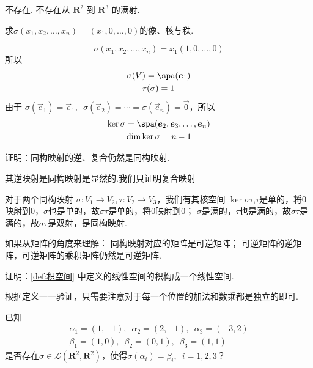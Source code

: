 \begin{exercise}
\begin{exgroup}
        \begin{answer}
            不存在. 不存在从 $ \mathbf{R}^2 $ 到 $ \mathbf{R}^3 $ 的满射.
        \end{answer}
        \item 求$\sigma(x_1,x_2,\ldots,x_n)=(x_1,0,\ldots,0)$的像、核与秩.
        \begin{answer}
            \[ \sigma(x_1, x_2, \ldots, x_n) = x_1(1, 0, \ldots, 0) \]
          所以
          \begin{gather*}
              \sigma(V) = \spa(\vec{e}_1) \\
              r(\sigma) = 1
          \end{gather*}
          由于 $ \sigma(\vec{e}_1) = \vec{e}_1,\enspace \sigma(\vec{e}_2) = \cdots = \sigma(\vec{e}_n) = \vec{0} $，所以
          \begin{gather*}
              \ker \sigma = \spa(\vec{e}_2, \vec{e}_3, \ldots, \vec{e}_n) \\
              \dim \ker \sigma = n - 1
          \end{gather*}
        \end{answer}

        \item 证明：同构映射的逆、复合仍然是同构映射.
        \begin{answer}
            其逆映射是同构映射是显然的.我们只证明复合映射

            对于两个同构映射 $\sigma: V_1 \to V_2, \tau: V_2 \to V_3$，我们有其核空间
            $\ker \sigma \tau$,$\tau$是单的，将$0$映射到$0$，$\sigma$也是单的，故$\sigma\tau$是单的，将$0$映射到$0$；
            $\sigma$是满的，$\tau$也是满的，故$\sigma\tau$是满的，故$\sigma\tau$是双射，是同构映射.


            如果从矩阵的角度来理解：
            同构映射对应的矩阵是可逆矩阵；
            可逆矩阵的逆矩阵，可逆矩阵的乘积矩阵仍然是可逆矩阵.
        \end{answer}

        \item 证明：\autoref{def:积空间} 中定义的线性空间的积构成一个线性空间.
        \begin{answer}
           根据定义一一验证，只需要注意对于每一个位置的加法和数乘都是独立的即可.
        \end{answer}
    \end{exgroup}

    \begin{exgroup}
        \item 已知
        \begin{gather*}
            \alpha_1=(1,-1),\enspace\alpha_2=(2,-1),\enspace\alpha_3=(-3,2) \\
            \beta_1=(1,0),\enspace\beta_2=(0,1),\enspace\beta_3=(1,1)
        \end{gather*}
        是否存在$\sigma\in \mathcal{L}(\mathbf{R}^2,\mathbf{R}^2)$，使得$\sigma(\alpha_i)=\beta_i,\enspace i=1,2,3$？


\end{exgroup}
\end{exercise}
